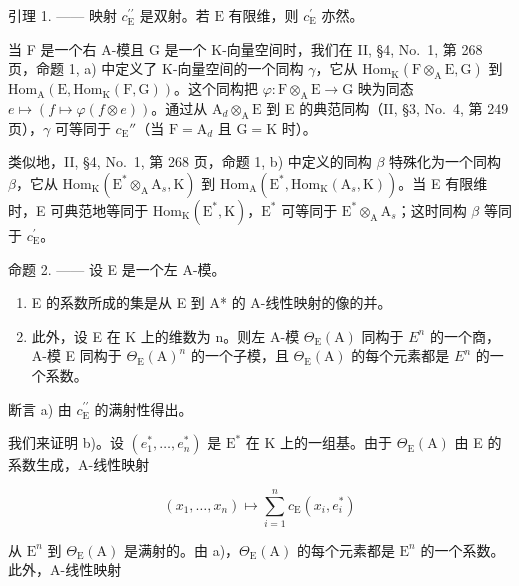 引理 1. —— 映射 \(c_{\mathrm{E}}^{\prime \prime}\) 是双射。若 \(\mathrm{E}\) 有限维，则 \(c_{\mathrm{E}}^{\prime}\) 亦然。

当 F 是一个右 A-模且 G 是一个 K-向量空间时，我们在 II, §4, No.~1, 第 268 页，命题 1, a) 中定义了 K-向量空间的一个同构 \(\gamma\)，它从 \(\mathrm{Hom}_{\mathrm{K}}(\mathrm{F} \otimes_{\mathrm{A}} \mathrm{E}, \mathrm{G})\) 到 \(\mathrm{Hom}_{\mathrm{A}}(\mathrm{E}, \mathrm{Hom}_{\mathrm{K}}(\mathrm{F}, \mathrm{G}))\)。这个同构把 \(\varphi : \mathrm{F} \otimes_{\mathrm{A}} \mathrm{E} \to \mathrm{G}\) 映为同态 \(e \mapsto (f \mapsto \varphi(f \otimes e))\)。通过从 \(\mathrm{A}_d \otimes_{\mathrm{A}} \mathrm{E}\) 到 E 的典范同构（II, §3, No.~4, 第 249 页），\(\gamma\) 可等同于 \(c_{\mathrm{E}}''\)（当 \(\mathrm{F} = \mathrm{A}_d\) 且 \(\mathrm{G} = \mathrm{K}\) 时）。

类似地，II, §4, No.~1, 第 268 页，命题 1, b) 中定义的同构 \(\beta\) 特殊化为一个同构 \(\beta\)，它从 \(\mathrm{Hom}_{\mathrm{K}}(\mathrm{E}^{*}\otimes_{\mathrm{A}}\mathrm{A}_{s},\mathrm{K})\) 到 \(\mathrm{Hom}_{\mathrm{A}}(\mathrm{E}^{*},\mathrm{Hom}_{\mathrm{K}}(\mathrm{A}_{s},\mathrm{K}))\)。当 E 有限维时，E 可典范地等同于 \(\mathrm{Hom}_{\mathrm{K}}(\mathrm{E}^{*},\mathrm{K})\)，\(\mathrm{E}^{*}\) 可等同于 \(\mathrm{E}^{*}\otimes_{\mathrm{A}}\mathrm{A}_{s}\)；这时同构 \(\beta\) 等同于 \(c_{\mathrm{E}}^{\prime}\)。

命题 2. —— 设 E 是一个左 A-模。

\begin{enumerate}
\def\labelenumi{\alph{enumi})}
\item
  E 的系数所成的集是从 E 到 A* 的 A-线性映射的像的并。
\item
  此外，设 E 在 K 上的维数为 n。则左 A-模 \(\Theta_{\mathrm{E}}(\mathrm{A})\) 同构于 \(E^{n}\) 的一个商，A-模 E 同构于 \(\Theta_{\mathrm{E}}(\mathrm{A})^{n}\) 的一个子模，且 \(\Theta_{\mathrm{E}}(\mathrm{A})\) 的每个元素都是 \(E^{n}\) 的一个系数。
\end{enumerate}

断言 a) 由 \(c_{\mathrm{E}}^{\prime \prime}\) 的满射性得出。

我们来证明 b)。设 \((e_1^*,\ldots ,e_n^*)\) 是 \(\mathrm{E}^*\) 在 K 上的一组基。由于 \(\Theta_{\mathrm{E}}(\mathrm{A})\) 由 E 的系数生成，A-线性映射

\[
(x _ {1}, \ldots , x _ {n}) \mapsto \sum_ {i = 1} ^ {n} c _ {\mathrm{E}} (x _ {i}, e _ {i} ^ {*})
\]

从 \(\mathrm{E}^n\) 到 \(\Theta_{\mathrm{E}}(\mathrm{A})\) 是满射的。由 a)，\(\Theta_{\mathrm{E}}(\mathrm{A})\) 的每个元素都是 \(\mathrm{E}^n\) 的一个系数。此外，A-线性映射


